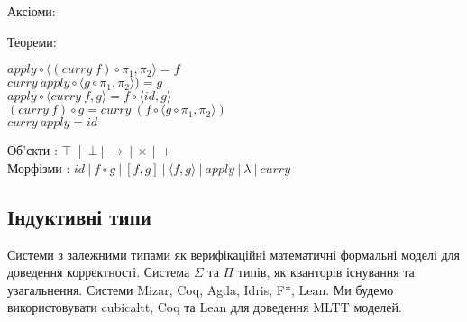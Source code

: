 \begin{fullwidth}
\hspace{-2cm}
\begingroup
\parbox[t][][l]{0.40\textwidth}{

    Аксіоми:

\begin{prooftree}
\end{prooftree}

\begin{prooftree}
\end{prooftree}

\begin{prooftree}
\end{prooftree}

}
\hspace{1cm}
\parbox[t][][r]{0.60\textwidth}{

Теореми:

\begin{center}
$apply \circ \langle (curry\ f) \circ \pi_1 , \pi_2 \rangle = f$\\
$curry\ apply \circ \langle g \circ \pi_1, \pi_2 \rangle) = g$\\
$apply \circ \langle curry\ f, g \rangle = f \circ \langle id , g\rangle$\\
$(curry\ f) \circ g = curry\ (f \circ \langle g \circ \pi_1,\pi_2\rangle)$\\
$curry\ apply = id$\\
\end{center}
}
\endgroup
\end{fullwidth}

\begin{center}
Об’єкти : $\top$\ |\ $\bot\ |\ \rightarrow\ |\ \times\ |\ +$\\
Морфізми : $id\ |\ f \circ g\ |\ [f,g]\ |\ \langle f, g \rangle\ |\ apply\ |\ \lambda\ |\ curry$
\end{center}


\newpage
    \subsection{Індуктивні типи}
    Системи з залежними типами як верифікаційні математичні формальні моделі
    для доведення корректності. Система $\Sigma$ та $\Pi$ типів, як кванторів
    існування та узагальнення. Системи Mizar, Coq, Agda, Idris, F*, Lean. Ми будемо
    використовувати cubicaltt, Coq та Lean для доведення MLTT моделей.

